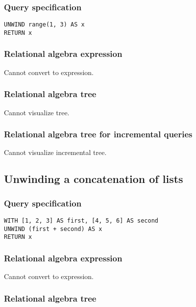 \subsubsection*{Query specification}

\begin{lstlisting}
UNWIND range(1, 3) AS x
RETURN x
\end{lstlisting}

\subsubsection*{Relational algebra expression}

Cannot convert to expression.

\subsubsection*{Relational algebra tree}

Cannot visualize tree.

\subsubsection*{Relational algebra tree for incremental queries}

Cannot visualize incremental tree.

\subsection{Unwinding a concatenation of lists}

\subsubsection*{Query specification}

\begin{lstlisting}
WITH [1, 2, 3] AS first, [4, 5, 6] AS second
UNWIND (first + second) AS x
RETURN x
\end{lstlisting}

\subsubsection*{Relational algebra expression}

Cannot convert to expression.

\subsubsection*{Relational algebra tree}


